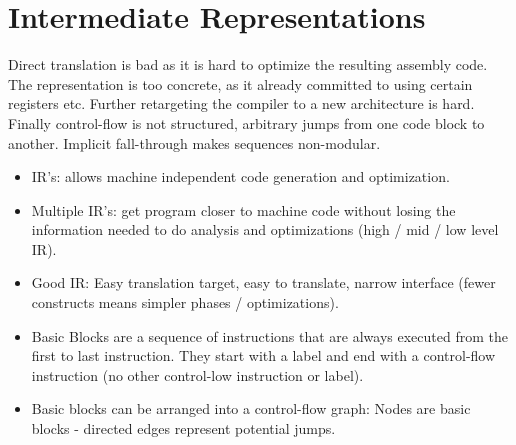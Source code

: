 \section*{Intermediate Representations}

Direct translation is bad as it is hard to optimize the resulting assembly code. The representation is too concrete, as it already committed to using certain registers etc. Further retargeting the compiler to a new architecture is hard. Finally control-flow is not structured, arbitrary jumps from one code block to another. Implicit fall-through makes sequences non-modular.

\begin{itemize}
	\item IR's: allows machine independent code generation and optimization.
	
	\item Multiple IR's: get program closer to machine code without losing the information needed to do analysis and optimizations (high / mid / low level IR).
		
	\item Good IR: Easy translation target, easy to translate, narrow interface (fewer constructs means simpler phases / optimizations).
	
	\item Basic Blocks are a sequence of instructions that are always executed from the first to last instruction. They start with a label and end with a control-flow instruction (no other control-low instruction or label).
	
	\item Basic blocks can be arranged into a control-flow graph: Nodes are basic blocks - directed edges represent potential jumps.
\end{itemize}

